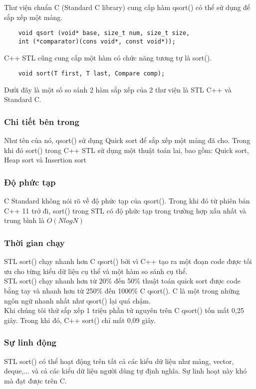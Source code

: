 \documentclass{article}
\begin{document}
Thư viện chuẩn C (Standard C library) cung cấp hàm qsort() có thể sử dụng để sắp xếp một mảng.
\begin{verbatim}
    void qsort (void* base, size_t num, size_t size, 
    int (*comparator)(cons void*, const void*));
\end{verbatim}

C++ STL cũng cung cấp một hàm có chức năng tương tự là sort(). 

\begin{verbatim}
    void sort(T first, T last, Compare comp);
\end{verbatim}

Dưới đây là một số so sánh 2 hàm sắp xếp của 2 thư viện là STL C++ và Standard C.

\subsubsection{Chi tiết bên trong}
Như tên của nó, qsort() sử dụng Quick sort để sắp xếp một mảng đã cho. Trong khi đó sort() trong C++ STL sử dụng một thuật toán lai, bao gồm: Quick sort, Heap sort và Insertion sort  

\subsubsection{Độ phức tạp}
C Standard không nói rõ về độ phức tạp của qsort(). Trong khi đó từ phiên bản C++ 11 trở đi, sort() trong STL có độ phức tạp trong trường hợp xấu nhất và trung bình là $O(NlogN)$

\subsubsection{Thời gian chạy}
STL sort() chạy nhanh hơn C qsort() bởi vì C++ tạo ra một đoạn code được tối ưu cho từng kiểu dữ liệu cụ thể và một hàm so sánh cụ thể.\\

STL sort() chạy nhanh hơn từ 20\% đến 50\% thuật toán quick sort được code bằng tay và nhanh hơn từ 250\% đến 1000\% C qsort(). C là một trong những ngôn ngữ nhanh nhất như qsort() lại quá chậm.\\

Khi chúng tôi thử sắp xếp 1 triệu phần tử nguyên trên C qsort() tốn mất 0,25 giây. Trong khi đó, C++ sort() chỉ mất 0,09 giây.

\subsubsection{Sự linh động}
STL sort() có thể hoạt động trên tất cả các kiểu dữ liệu như mảng, vector, deque,... và cả các kiểu dữ liệu người dùng tự định nghĩa. Sự linh hoạt này khó mà đạt được trên C.
\end{document}
